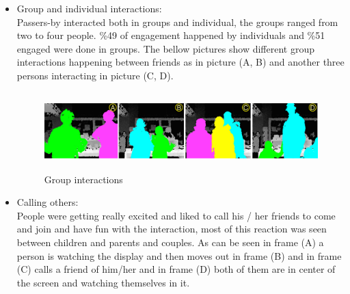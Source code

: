 \begin{enumerate}
\begin{itemize}
\item Group and individual interactions: \\
Passers-by interacted both in groups and individual, the groups ranged from two to four people. \%49 of engagement happened by individuals and \%51 engaged were done in groups. 
 The bellow pictures show different group interactions happening between friends as in picture (A, B) and another three persons interacting in picture (C, D).

\begin{minipage}{0.89\textwidth}
\begin{flushright}
\begin{figure}[H]
    \centering
    \includegraphics[width=\textwidth,height=30mm]{Figures/8/body_inter_findings/effects/group}
    \caption{Group interactions}
    \label{fig:group_interaction}
\end{figure}
\end{flushright}
\end{minipage}







\item Calling others: \\
People were getting really excited and liked to call his / her friends to come and join and have fun with the interaction, most of this reaction was seen between children and parents and couples. As can be seen in frame (A) a person is watching the display and then moves out in frame (B) and in frame (C) calls a friend of him/her and in frame (D) both of them are in center of the screen and watching themselves in it.


\end{itemize}
\end{enumerate}
